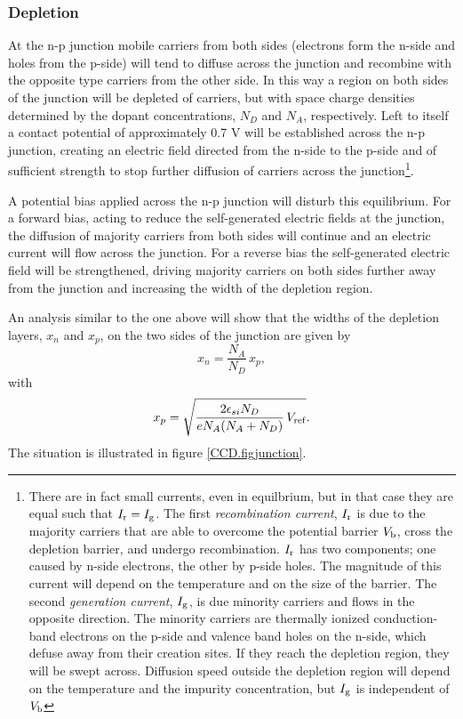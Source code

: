\documentclass{article}
\begin{document}
\subsubsection*{Depletion}

At the n-p junction mobile carriers from both sides (electrons form
the n-side and holes from the p-side) will tend to diffuse across the
junction and recombine with the opposite type carriers from the other
side. In this way a region on both sides of the junction will be
depleted of carriers, but with space charge densities determined by
the dopant concentrations, $N_D$ and $N_A$, respectively. Left to
itself a contact potential of approximately 0.7 V will be established
across the n-p junction, creating an electric field directed from the
n-side to the p-side and of sufficient strength to stop further
diffusion of carriers across the junction\footnote{There are in fact
  small currents, even in equilbrium, but in that case they are equal
  such that $I_{\rm r}=I_{\rm g}$. The first {\it recombination
    current}, $I_{\rm r}$ is due to the majority carriers that are
  able to overcome the potential barrier $V_{\rm b}$, cross the
  depletion barrier, and undergo recombination. $I_{\rm r}$ has two
  components; one caused by n-side electrons, the other by p-side
  holes. The magnitude of this current will depend on the temperature
  and on the size of the barrier. The second {\it generation current},
  $I_{\rm g}$, is due minority carriers and flows in the opposite
  direction. The minority carriers are thermally ionized
  conduction-band electrons on the p-side and valence band holes on
  the n-side, which defuse away from their creation sites. If they
  reach the depletion region, they will be swept across. Diffusion
  speed outside the depletion region will depend on the temperature
  and the impurity concentration, but $I_{\rm g}$ is independent of $V_{\rm b}$}.

A potential bias applied across the n-p junction will disturb this
equilibrium. For a forward bias, acting to reduce the self-generated
electric fields at the junction, the diffusion of majority carriers
from both sides will continue and an electric current will flow across
the junction. For a reverse bias the self-generated electric field
will be strengthened, driving majority carriers on both sides further
away from the junction and increasing the width of the depletion
region.

An analysis similar to the one above will show that the widths of the
depletion layers, $x_n$ and $x_p$, on the two sides of the junction
are given by
\begin{equation}
  x_n = \frac{N_A}{N_D} \, x_p,
 \label{eq:npjunction1}
\end{equation}
with
\begin{equation}
  x_p = \sqrt{\frac{2\epsilon_{si} N_D}{eN_A(N_A+N_D)} \, V_{\rm ref}}. 
 \label{eq:npjunction2}
\end{equation}
The situation is illustrated in figure \ref{CCD.figjunction}.
\end{document}
